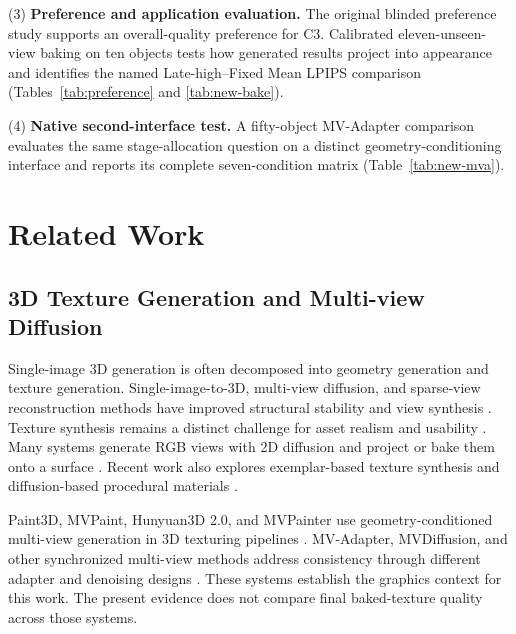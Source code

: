 \documentclass[times,twocolumn,final]{elsarticle}
\begin{document}
(3) \textbf{Preference and application evaluation.} The original blinded preference study supports an overall-quality preference for C3. Calibrated eleven-unseen-view baking on ten objects tests how generated results project into appearance and identifies the named Late-high--Fixed Mean LPIPS comparison (Tables~\ref{tab:preference} and \ref{tab:new-bake}).

(4) \textbf{Native second-interface test.} A fifty-object MV-Adapter comparison evaluates the same stage-allocation question on a distinct geometry-conditioning interface and reports its complete seven-condition matrix (Table~\ref{tab:new-mva}).

\section{Related Work}
\label{sec:related}

\subsection{3D Texture Generation and Multi-view Diffusion}
\label{subsec:3dtex}

Single-image 3D generation is often decomposed into geometry generation and texture generation. Single-image-to-3D, multi-view diffusion, and sparse-view reconstruction methods have improved structural stability and view synthesis \cite{liu2023zero1to3,shi2023zero123pp,liu2023syncdreamer,long2023wonder3d,shi2024mvdream,wang2023imagedream,xu2024instantmesh,ke2024era3d}. Texture synthesis remains a distinct challenge for asset realism and usability \cite{perla2026survey}. Many systems generate RGB views with 2D diffusion and project or bake them onto a surface \cite{chen2023text2tex,richardson2023texture,poole2023dreamfusion,chen2023fantasia3d}. Recent work also explores exemplar-based texture synthesis and diffusion-based procedural materials \cite{guzman2026adaptive,lv2025interpretable}.

Paint3D, MVPaint, Hunyuan3D 2.0, and MVPainter use geometry-conditioned multi-view generation in 3D texturing pipelines \cite{zeng2024paint3d,cheng2024mvpaint,lai2025hunyuan3d,shao2025mvpainter}. MV-Adapter, MVDiffusion, and other synchronized multi-view methods address consistency through different adapter and denoising designs \cite{huang2024mvadapter,tang2023mvdiffusion,liu2024synchronized,xu2026wondertex}. These systems establish the graphics context for this work. The present evidence does not compare final baked-texture quality across those systems.
\end{document}
